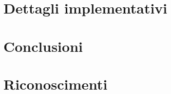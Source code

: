 \documentclass[12pt,a4paper]{book}
\begin{document}
    \chapter{Dettagli implementativi}
    \label{CH:Val_num}
    
    
    \chapter{Conclusioni}
    \label{CH:Concl}
    
    
    \chapter{Riconoscimenti}
    \label{CH:Ric}
    
    
    
    
    
    \listoffigures
\end{document}
